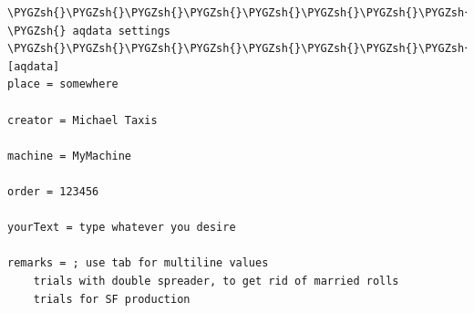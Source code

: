 \documentclass[a4paper,10pt,english]{sphinxmanual}
\def\PYGZsh{\char`\#}
\begin{document}
\begin{Verbatim}[commandchars=\\\{\}]
\PYGZsh{}\PYGZsh{}\PYGZsh{}\PYGZsh{}\PYGZsh{}\PYGZsh{}\PYGZsh{}\PYGZsh{}\PYGZsh{}\PYGZsh{}\PYGZsh{}\PYGZsh{}\PYGZsh{}\PYGZsh{}\PYGZsh{}\PYGZsh{}\PYGZsh{}\PYGZsh{}\PYGZsh{}\PYGZsh{}\PYGZsh{}\PYGZsh{}\PYGZsh{}\PYGZsh{}\PYGZsh{}\PYGZsh{}\PYGZsh{}\PYGZsh{}\PYGZsh{}\PYGZsh{}\PYGZsh{}\PYGZsh{}\PYGZsh{}\PYGZsh{}\PYGZsh{}\PYGZsh{}\PYGZsh{}\PYGZsh{}\PYGZsh{}\PYGZsh{}\PYGZsh{}\PYGZsh{}\PYGZsh{}\PYGZsh{}\PYGZsh{}\PYGZsh{}\PYGZsh{}\PYGZsh{}\PYGZsh{}\PYGZsh{}\PYGZsh{}\PYGZsh{}\PYGZsh{}\PYGZsh{}\PYGZsh{}\PYGZsh{}\PYGZsh{}\PYGZsh{}\PYGZsh{}\PYGZsh{}\PYGZsh{}\PYGZsh{}\PYGZsh{}\PYGZsh{}\PYGZsh{}\PYGZsh{}\PYGZsh{}\PYGZsh{}\PYGZsh{}\PYGZsh{}\PYGZsh{}\PYGZsh{}
\PYGZsh{} aqdata settings
\PYGZsh{}\PYGZsh{}\PYGZsh{}\PYGZsh{}\PYGZsh{}\PYGZsh{}\PYGZsh{}\PYGZsh{}\PYGZsh{}\PYGZsh{}\PYGZsh{}\PYGZsh{}\PYGZsh{}\PYGZsh{}\PYGZsh{}\PYGZsh{}\PYGZsh{}\PYGZsh{}\PYGZsh{}\PYGZsh{}\PYGZsh{}\PYGZsh{}\PYGZsh{}\PYGZsh{}\PYGZsh{}\PYGZsh{}\PYGZsh{}\PYGZsh{}\PYGZsh{}\PYGZsh{}\PYGZsh{}\PYGZsh{}\PYGZsh{}\PYGZsh{}\PYGZsh{}\PYGZsh{}\PYGZsh{}\PYGZsh{}\PYGZsh{}\PYGZsh{}\PYGZsh{}\PYGZsh{}\PYGZsh{}\PYGZsh{}\PYGZsh{}\PYGZsh{}\PYGZsh{}\PYGZsh{}\PYGZsh{}\PYGZsh{}\PYGZsh{}\PYGZsh{}\PYGZsh{}\PYGZsh{}\PYGZsh{}\PYGZsh{}\PYGZsh{}\PYGZsh{}\PYGZsh{}\PYGZsh{}\PYGZsh{}\PYGZsh{}\PYGZsh{}\PYGZsh{}\PYGZsh{}\PYGZsh{}\PYGZsh{}\PYGZsh{}\PYGZsh{}\PYGZsh{}\PYGZsh{}\PYGZsh{}
[aqdata]
place = somewhere

creator = Michael Taxis

machine = MyMachine

order = 123456

yourText = type whatever you desire

remarks = ; use tab for multiline values
    trials with double spreader, to get rid of married rolls
    trials for SF production
\end{Verbatim}
\end{document}
